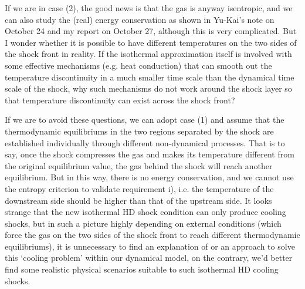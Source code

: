 \documentclass[fleqn,usenatbib]{mnras}
\begin{document}
If we are in case (2), the good news is that the gas is anyway isentropic, and we can also study the (real) energy conservation as shown in Yu-Kai's note on October 24 and my report on October 27, although this is very complicated. But I wonder whether it is possible to have different temperatures on the two sides of the shock front in reality. If the isothermal approximation itself is involved with some effective mechanisms (e.g. heat conduction) that can smooth out the temperature discontinuity in a much smaller time scale than the dynamical time scale of the shock, why such mechanisms do not work around the shock layer so that temperature discontinuity can exist across the shock front? 

If we are to avoid these questions, we can adopt case (1) and assume that the thermodynamic equilibriums in the two regions separated by the shock are established individually through different non-dynamical processes. That is to say, once the shock compresses the gas and makes its temperature different from the original equilibrium value, the gas behind the shock will reach another equilibrium. But in this way, there is no energy conservation, and we cannot use the entropy criterion to validate requirement i), i.e. the temperature of the downstream side should be higher than that of the upstream side. It looks strange that the new isothermal HD shock condition can only produce cooling shocks, but in such a picture highly depending on external conditions (which force the gas on the two sides of the shock front to reach different thermodynamic equilibriums), it is unnecessary to find an explanation of or an approach to solve this `cooling problem' within our dynamical model, on the contrary, we'd better find some realistic physical scenarios suitable to such isothermal HD cooling shocks.






 

\label{lastpage}
\end{document}
